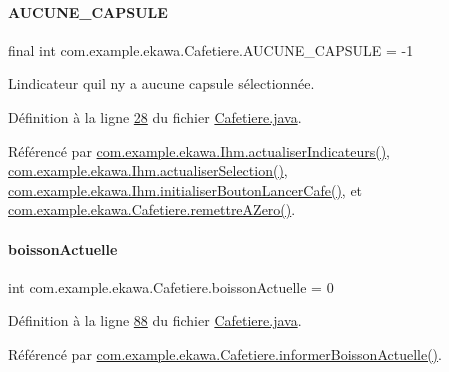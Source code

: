 \paragraph{\texorpdfstring{A\+U\+C\+U\+N\+E\+\_\+\+C\+A\+P\+S\+U\+LE}{AUCUNE\_CAPSULE}}
{\footnotesize\ttfamily final int com.\+example.\+ekawa.\+Cafetiere.\+A\+U\+C\+U\+N\+E\+\_\+\+C\+A\+P\+S\+U\+LE = -\/1\hspace{0.3cm}{\ttfamily [static]}}



L\textquotesingle{}indicateur qu\textquotesingle{}il n\textquotesingle{}y a aucune capsule sélectionnée. 



Définition à la ligne \hyperlink{_cafetiere_8java_source_l00028}{28} du fichier \hyperlink{_cafetiere_8java_source}{Cafetiere.\+java}.



Référencé par \hyperlink{_ihm_8java_source_l00855}{com.\+example.\+ekawa.\+Ihm.\+actualiser\+Indicateurs()}, \hyperlink{_ihm_8java_source_l00892}{com.\+example.\+ekawa.\+Ihm.\+actualiser\+Selection()}, \hyperlink{_ihm_8java_source_l00526}{com.\+example.\+ekawa.\+Ihm.\+initialiser\+Bouton\+Lancer\+Cafe()}, et \hyperlink{_cafetiere_8java_source_l00658}{com.\+example.\+ekawa.\+Cafetiere.\+remettre\+A\+Zero()}.

\mbox{\label{classcom_1_1example_1_1ekawa_1_1_cafetiere_a73c5fa3b510655e1e3425140336b7f5b}} 
\paragraph{\texorpdfstring{boisson\+Actuelle}{boissonActuelle}}
{\footnotesize\ttfamily int com.\+example.\+ekawa.\+Cafetiere.\+boisson\+Actuelle = 0\hspace{0.3cm}{\ttfamily [private]}}



Définition à la ligne \hyperlink{_cafetiere_8java_source_l00088}{88} du fichier \hyperlink{_cafetiere_8java_source}{Cafetiere.\+java}.



Référencé par \hyperlink{_cafetiere_8java_source_l00245}{com.\+example.\+ekawa.\+Cafetiere.\+informer\+Boisson\+Actuelle()}.

